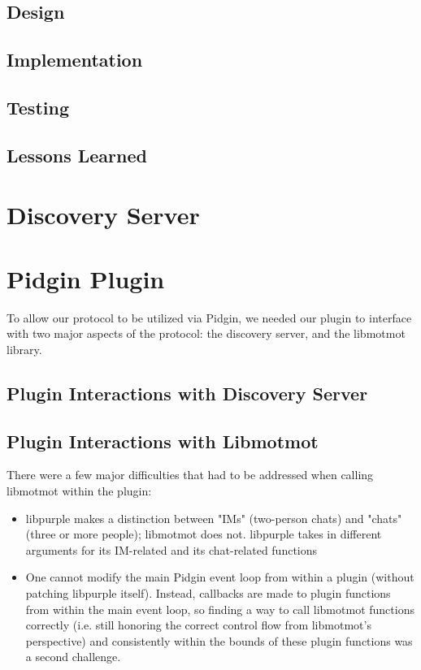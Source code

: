 \documentclass{sig-alternate}
\begin{document}
\subsection{Design}



\subsection{Implementation}

\subsection{Testing}

\subsection{Lessons Learned}

\section{Discovery Server}

\section{Pidgin Plugin}

To allow our protocol to be utilized via Pidgin, we needed our plugin to interface with two major aspects of the protocol: the discovery server, and the libmotmot library.

\subsection{Plugin Interactions with Discovery Server}

\subsection{Plugin Interactions with Libmotmot}
There were a few major difficulties that had to be addressed when calling libmotmot within the plugin:

\begin{itemize}
\item libpurple makes a distinction between "IMs" (two-person chats) and "chats" (three or more people); libmotmot does not.  libpurple takes in different arguments for its IM-related and its chat-related functions

\item One cannot modify the main Pidgin event loop from within a plugin (without patching libpurple itself).  Instead, callbacks are made to plugin functions from within the main event loop, so finding a way to call libmotmot functions correctly (i.e. still honoring the correct control flow from libmotmot's perspective) and consistently within the bounds of these plugin functions was a second challenge.

\end{itemize}
\end{document}

